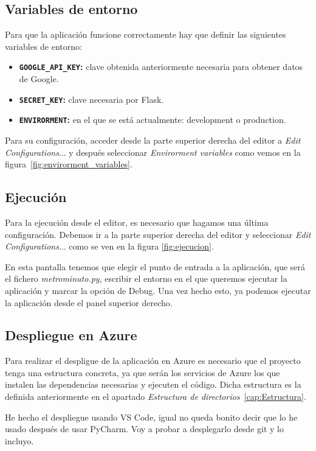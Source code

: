 \subsection{Variables de entorno}\label{variables_entorno}
Para que la aplicación funcione correctamente hay que definir las siguientes variables de entorno:
\begin{itemize}
	\item \textbf{\texttt{GOOGLE\_API\_KEY}:} clave obtenida anteriormente necesaria para obtener datos de Google.
	\item \textbf{\texttt{SECRET\_KEY}:} clave necesaria por Flask.
	\item \textbf{\texttt{ENVIRORMENT}:} en el que se está actualmente: development o production.
\end{itemize}
Para su configuración, acceder desde la parte superior derecha del editor a \textit{Edit Configurations$\dots$} y después seleccionar \textit{Envirorment variables} como vemos en la figura~\ref{fig:envirorment_variables}.

\subsection{Ejecución}
Para la ejecución desde el editor, es necesario que hagamos una última configuración. Debemos ir a la parte superior derecha del editor y seleccionar \textit{Edit Configurations$\dots$} como se ven en la figura \ref{fig:ejecucion}.

En esta pantalla tenemos que elegir el punto de entrada a la aplicación, que será el fichero \textit{metrominuto.py}, escribir el entorno en el que queremos ejecutar la aplicación y marcar la opción de Debug. Una vez hecho esto, ya podemos ejecutar la aplicación desde el panel superior derecho.

\subsection{Despliegue en Azure}
Para realizar el despligue de la aplicación en Azure es necesario que el proyecto tenga una estructura concreta, ya que serán los servicios de Azure los que instalen las dependencias necesarias y ejecuten el código. Dicha estructura es la definida anteriormente en el apartado \textit{Estructura de directorios}~\ref{cap:Estructura}.

He hecho el despliegue usando VS Code, igual no queda bonito decir que lo he usado después de usar PyCharm. Voy a probar a desplegarlo desde git y lo incluyo. 

